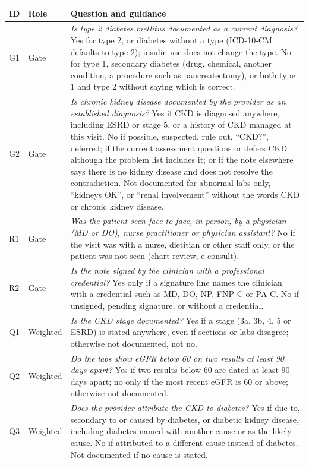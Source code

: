 \documentclass[10pt,letterpaper]{article}
\begin{document}
\begin{small}
\noindent\begin{tabularx}{\textwidth}{@{}p{0.6cm}p{1.4cm}L@{}}
\toprule
ID & Role & Question and guidance \\
\midrule
G1 & Gate & \textit{Is type 2 diabetes mellitus documented as a current diagnosis?} Yes for type 2, or diabetes without a type (ICD-10-CM defaults to type 2); insulin use does not change the type. No for type 1, secondary diabetes (drug, chemical, another condition, a procedure such as pancreatectomy), or both type 1 and type 2 without saying which is correct. \\
G2 & Gate & \textit{Is chronic kidney disease documented by the provider as an established diagnosis?} Yes if CKD is diagnosed anywhere, including ESRD or stage 5, or a history of CKD managed at this visit. No if possible, suspected, rule out, ``CKD?'', deferred; if the current assessment questions or defers CKD although the problem list includes it; or if the note elsewhere says there is no kidney disease and does not resolve the contradiction. Not documented for abnormal labs only, ``kidneys OK'', or ``renal involvement'' without the words CKD or chronic kidney disease. \\
R1 & Gate & \textit{Was the patient seen face-to-face, in person, by a physician (MD or DO), nurse practitioner or physician assistant?} No if the visit was with a nurse, dietitian or other staff only, or the patient was not seen (chart review, e-consult). \\
R2 & Gate & \textit{Is the note signed by the clinician with a professional credential?} Yes only if a signature line names the clinician with a credential such as MD, DO, NP, FNP-C or PA-C. No if unsigned, pending signature, or without a credential. \\
Q1 & Weighted & \textit{Is the CKD stage documented?} Yes if a stage (3a, 3b, 4, 5 or ESRD) is stated anywhere, even if sections or labs disagree; otherwise not documented, not no. \\
Q2 & Weighted & \textit{Do the labs show eGFR below 60 on two results at least 90 days apart?} Yes if two results below 60 are dated at least 90 days apart; no only if the most recent eGFR is 60 or above; otherwise not documented. \\
Q3 & Weighted & \textit{Does the provider attribute the CKD to diabetes?} Yes if due to, secondary to or caused by diabetes, or diabetic kidney disease, including diabetes named with another cause or as the likely cause. No if attributed to a different cause instead of diabetes. Not documented if no cause is stated. \\

\end{tabularx}
\end{small}
\end{document}
